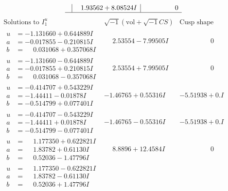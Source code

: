 \documentclass[1p]{elsarticle_modified}
\theoremstyle{definition}
\newcommand{\I}{\sqrt{-1}}
\begin{document}
$$\begin{array}{c|c|c}
 & \phantom{-}1.93562 + 8.08524 I & \phantom{-0.000000 } 0\\
 \hline 
 \end{array}$$\newpage$$\begin{array}{c|c|c}  
\text{Solutions to }I^u_{1}& \I (\text{vol} + \sqrt{-1}CS) & \text{Cusp shape}\\
 \hline 
\begin{aligned}
u &= -1.131660 + 0.644889 I \\
a &= -0.017855 - 0.210815 I \\
b &= \phantom{-}0.031068 + 0.357068 I\end{aligned}
 & \phantom{-}2.53554 - 7.99505 I & \phantom{-0.000000 } 0 \\ \hline\begin{aligned}
u &= -1.131660 - 0.644889 I \\
a &= -0.017855 + 0.210815 I \\
b &= \phantom{-}0.031068 - 0.357068 I\end{aligned}
 & \phantom{-}2.53554 + 7.99505 I & \phantom{-0.000000 } 0 \\ \hline\begin{aligned}
u &= -0.414707 + 0.543229 I \\
a &= -1.44411 - 0.01878 I \\
b &= -0.514799 + 0.077401 I\end{aligned}
 & -1.46765 + 0.55316 I & -5.51938 + 0. I\phantom{ +0.000000I} \\ \hline\begin{aligned}
u &= -0.414707 - 0.543229 I \\
a &= -1.44411 + 0.01878 I \\
b &= -0.514799 - 0.077401 I\end{aligned}
 & -1.46765 - 0.55316 I & -5.51938 + 0. I\phantom{ +0.000000I} \\ \hline\begin{aligned}
u &= \phantom{-}1.177350 + 0.622821 I \\
a &= \phantom{-}1.83782 + 0.61130 I \\
b &= \phantom{-}0.52036 - 1.47796 I\end{aligned}
 & \phantom{-}8.8896 + 12.4584 I & \phantom{-0.000000 } 0 \\ \hline\begin{aligned}
u &= \phantom{-}1.177350 - 0.622821 I \\
a &= \phantom{-}1.83782 - 0.61130 I \\
b &= \phantom{-}0.52036 + 1.47796 I\end{aligned}

\end{array}$$
\end{document}
